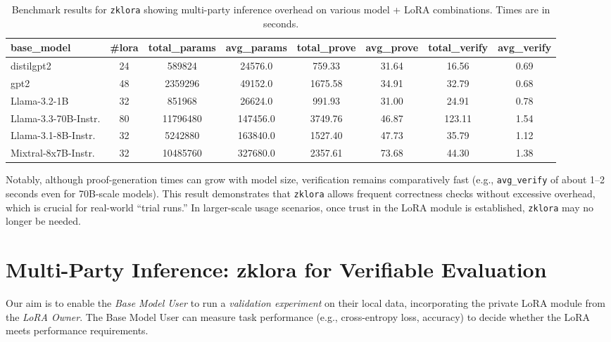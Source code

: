 \documentclass[11pt]{article}
\begin{document}
\begin{table}[ht]
    \centering
    \small
    \begin{tabular}{l c c c c c c c}
    \toprule
    \textbf{base\_model} & \textbf{\#lora} & \textbf{total\_params} & \textbf{avg\_params} & \textbf{total\_prove} & \textbf{avg\_prove} & \textbf{total\_verify} & \textbf{avg\_verify} \\
    \midrule
distilgpt2 & 24 & 589824 & 24576.0 & 759.33 & 31.64 & 16.56 & 0.69 \\
gpt2 & 48 & 2359296 & 49152.0 & 1675.58 & 34.91 & 32.79 & 0.68 \\
Llama-3.2-1B & 32 & 851968 & 26624.0 & 991.93 & 31.00 & 24.91 & 0.78 \\
Llama-3.3-70B-Instr. & 80 & 11796480 & 147456.0 & 3749.76 & 46.87 & 123.11 & 1.54 \\
Llama-3.1-8B-Instr. & 32 & 5242880 & 163840.0 & 1527.40 & 47.73 & 35.79 & 1.12 \\
Mixtral-8x7B-Instr. & 32 & 10485760 & 327680.0 & 2357.61 & 73.68 & 44.30 & 1.38 \\
    \bottomrule
    \end{tabular}
    \caption{Benchmark results for \texttt{zklora} showing multi-party inference overhead on various model + LoRA combinations. Times are in seconds.}
    \label{tab:results}
\end{table}

Notably, although proof-generation times can grow with model size, verification remains comparatively fast (e.g., \texttt{avg\_verify} of about 1--2 seconds even for 70B-scale models). This result demonstrates that \texttt{zklora} allows frequent correctness checks without excessive overhead, which is crucial for real-world “trial runs.” In larger-scale usage scenarios, once trust in the LoRA module is established, \texttt{zklora} may no longer be needed.

\section{Multi-Party Inference: zklora for Verifiable Evaluation}
Our aim is to enable the \emph{Base Model User} to run a \emph{validation experiment} on their local data, incorporating the private LoRA module from the \emph{LoRA Owner}. The Base Model User can measure task performance (e.g., cross-entropy loss, accuracy) to decide whether the LoRA meets performance requirements. 
\end{document}
